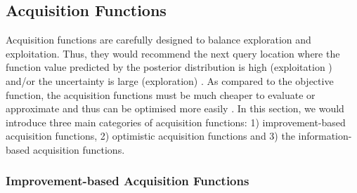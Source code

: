 \documentclass[a4paper,11pt]{report}
\begin{document}
\newpage
\subsection{Acquisition Functions } \label{acqusitionfunction}

Acquisition functions are carefully designed to balance exploration and exploitation. Thus, they would recommend the next query location where the function value predicted by the posterior distribution is high (exploitation ) and/or the uncertainty is large (exploration) \cite{brochu2010tutorial}. As compared to the objective function, the acquisition functions must be much cheaper to evaluate or approximate and thus can be optimised more easily \cite{shahriari2016taking}. In this section, we would introduce three main categories of acquisition functions: 1) improvement-based acquisition functions, 2) optimistic acquisition functions and 3) the information-based acquisition functions.

\subsubsection{Improvement-based Acquisition Functions}
\end{document}
